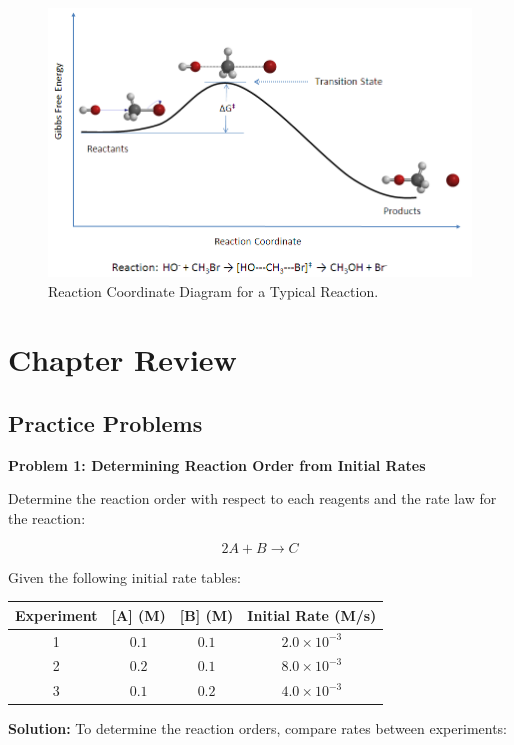 \documentclass[
  9pt,
]{extbook}
\theoremstyle{definition}
\theoremstyle{definition}
\theoremstyle{definition}
\theoremstyle{remark}
\begin{document}
\begin{figure}

{\centering \includegraphics[width=0.7\linewidth]{./img/Rxn_coordinate_diagram_5} 

}

\caption{Reaction Coordinate Diagram for a Typical Reaction.}\label{fig:figk9}
\end{figure}

\hypertarget{rev15}{%
\section{Chapter Review}\label{rev15}}

\hypertarget{exer15}{%
\subsection{Practice Problems}\label{exer15}}

\textbf{Problem 1: Determining Reaction Order from Initial Rates}

Determine the reaction order with respect to each reagents and the rate law for the reaction:

\[2A + B \rightarrow C\]

Given the following initial rate tables:

\begin{longtable}[]{@{}cccc@{}}
\toprule
Experiment & {[}A{]} (M) & {[}B{]} (M) & Initial Rate (M/s) \\
\midrule
\endhead
1 & \(0.1\) & \(0.1\) & \(2.0 \times 10^{-3}\) \\
2 & \(0.2\) & \(0.1\) & \(8.0 \times 10^{-3}\) \\
3 & \(0.1\) & \(0.2\) & \(4.0 \times 10^{-3}\) \\
\bottomrule
\end{longtable}

\textbf{Solution:} To determine the reaction orders, compare rates between experiments:
\end{document}
